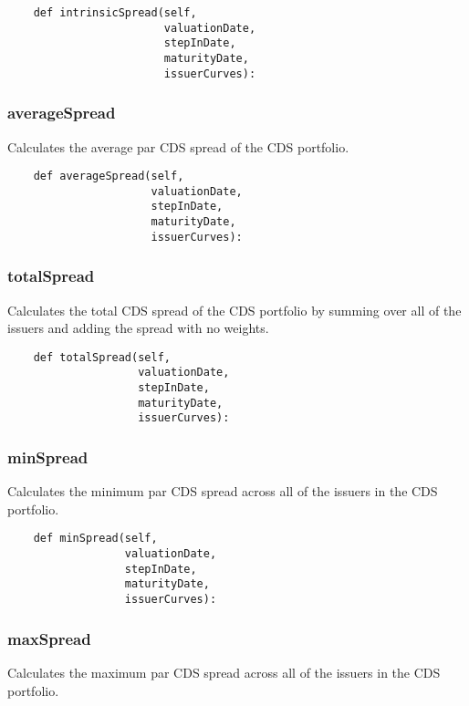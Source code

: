 \documentclass[twoside,11pt]{book}
\begin{document}
\begin{lstlisting}
    def intrinsicSpread(self,
                        valuationDate,
                        stepInDate,
                        maturityDate,
                        issuerCurves):
\end{lstlisting}

\subsubsection*{{\bf averageSpread}}
Calculates the average par CDS spread of the CDS portfolio.  

\begin{lstlisting}
    def averageSpread(self,
                      valuationDate,
                      stepInDate,
                      maturityDate,
                      issuerCurves):
\end{lstlisting}

\subsubsection*{{\bf totalSpread}}
Calculates the total CDS spread of the CDS portfolio by summing  over all of the issuers and adding the spread with no weights.  

\begin{lstlisting}
    def totalSpread(self,
                    valuationDate,
                    stepInDate,
                    maturityDate,
                    issuerCurves):
\end{lstlisting}

\subsubsection*{{\bf minSpread}}
Calculates the minimum par CDS spread across all of the issuers in the CDS portfolio.  

\begin{lstlisting}
    def minSpread(self,
                  valuationDate,
                  stepInDate,
                  maturityDate,
                  issuerCurves):
\end{lstlisting}

\subsubsection*{{\bf maxSpread}}
Calculates the maximum par CDS spread across all of the issuers in the CDS portfolio.  
\end{document}
